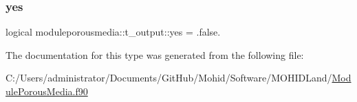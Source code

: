\subsubsection{\texorpdfstring{yes}{yes}}
{\footnotesize\ttfamily logical moduleporousmedia\+::t\+\_\+output\+::yes = .false.\hspace{0.3cm}{\ttfamily [private]}}



The documentation for this type was generated from the following file\+:\begin{DoxyCompactItemize}
\item 
C\+:/\+Users/administrator/\+Documents/\+Git\+Hub/\+Mohid/\+Software/\+M\+O\+H\+I\+D\+Land/\mbox{\hyperlink{_module_porous_media_8f90}{Module\+Porous\+Media.\+f90}}\end{DoxyCompactItemize}
